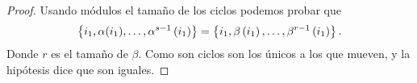 \begin{enumerate}[(i)]
\begin{proof}
            Usando módulos el tamaño de los ciclos podemos probar que 
            \[
                \left\{ i_1,\alpha ( i_1 ), \ldots, \alpha^{s-1} \left( i_1 \right)  \right\}
                =
                \left\{ i_1, \beta \left( i_1 \right), \ldots, \beta^{r-1} \left( i_1 \right)  \right\}.
            \]
            Donde \( r \) es el tamaño de \( \beta \).
            Como son ciclos son los únicos a los que mueven, y la hipótesis dice que son iguales.
        \end{proof}
\end{enumerate}
